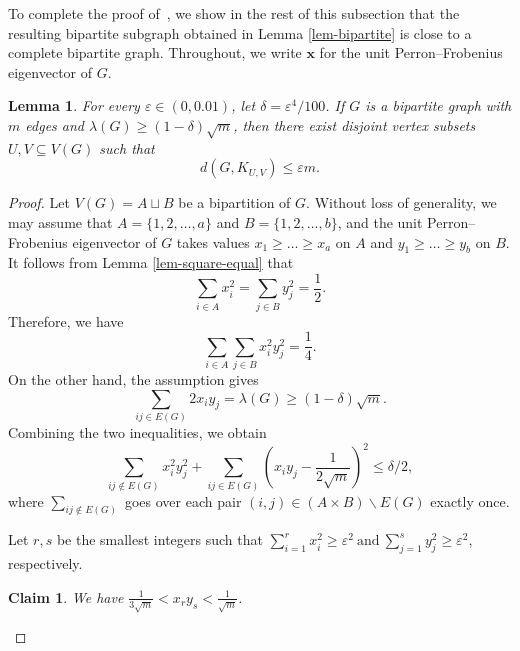 \documentclass[11pt,a4paper]{article}
\newtheorem{lemma}[theorem]{Lemma}
\newtheorem{claim}[theorem]{Claim}
\theoremstyle{definition}
\theoremstyle{remark}
\begin{document}
To complete the proof of~, 
we show in the rest of this subsection that the resulting bipartite subgraph obtained in Lemma \ref{lem-bipartite} 
is close to a complete bipartite graph. 
Throughout, we write $\bm{x}$ for the unit Perron--Frobenius eigenvector of $G$.


\begin{lemma}
\label{lem:close-to-Kab}
For every $\varepsilon \in (0,0.01)$, 
let $\delta = \varepsilon^4/100$. 
If $G$ is a bipartite graph with 
$m$ edges and $\lambda (G) \ge 
(1- \delta ) \sqrt{m}$, then there exist disjoint vertex subsets $U, V\subseteq V(G)$ such that 
\[ d(G, K_{U, V}) \leq \varepsilon m. \]  
\end{lemma}

\begin{proof}
 Let $V(G)=A\sqcup B$ be a bipartition of $G$. Without loss of generality, we may assume that $A = \{1,2,\ldots ,a\}$ and $B = \{1,2,\ldots ,b\}$, and the unit Perron--Frobenius eigenvector of $G$ takes values $x_1 \geq \dots \geq x_a$ on $A$ and $y_1 \geq \dots \geq y_b$ on $B$.   
 It follows from Lemma \ref{lem-square-equal} that
    $$\sum_{i \in A} x_i^2 = \sum_{j \in B} y_j^2 = \frac{1}{2}.$$
    Therefore, we have
    $$\sum_{i \in A} \sum_{j \in B} x_i^2y_j^2 = \frac{1}{4}.$$
    On the other hand, the assumption gives 
    $$\sum_{ij \in E(G)} 2x_i y_j = \lambda(G) \geq (1 - \delta) \sqrt{m}.$$
    Combining the two inequalities, we obtain
    \begin{equation}
    \label{eq:Motzkin-Straus-Exploit-I}
    \sum_{ij \notin E(G)} x_i^2 y_j^2 + \sum_{ij \in E(G)} \left(x_i y_j - \frac{1}{2\sqrt{m}}\right)^2 \leq \delta/2,
    \end{equation}
    where $\sum_{ij \notin E(G)}$ goes over each pair $(i, j) \in (A \times B )\backslash E(G)$ exactly once. 

    \medskip 
    Let $r, s$ be the smallest integers such that
   $\sum_{i = 1}^r x_i^2 \geq \varepsilon^2 
    ~\text{and}~  
    \sum_{j = 1}^s y_j^2 \geq \varepsilon^2$, respectively.   

\begin{claim}\label{cl:1}
We have $\frac{1}{3\sqrt{m}} < x_r y_s < \frac{1}{\sqrt{m}}$.
\end{claim}



\end{proof}
\end{document}
